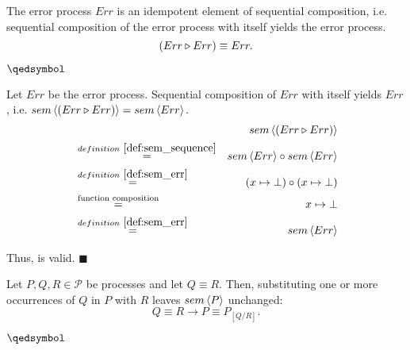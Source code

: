 \begin{theorem}
\label{thm:idempotence_err}
The error process $Err$ is an idempotent element of sequential composition, i.e. sequential composition of the error process with itself yields the error process.
\begin{equation*}
  \left( Err \triangleright Err \right) \equiv Err.
\end{equation*}

\hfill$\qedsymbol$
\end{theorem}

\begin{myproof}
Let $Err$ be the error process. Sequential composition of $Err$ with itself yields $Err$, i.e. $sem \left\langle \left( Err \triangleright Err \right) \right\rangle = sem \left\langle Err \right\rangle$.
\begin{eqnarray*}
  & & \sem{\sequence{Err}{Err}} \\
    & \overset{\defref{def:sem_sequence}}{=} & \sem{Err} \circ \sem{Err} \\
    & \overset{\defref{def:sem_err}}{=} & \left( x \mapsto \bot \right) \circ \left( x \mapsto \bot \right) \\
    & \overset{\text{function composition}}{=} & x \mapsto \bot \\
    & \overset{\defref{def:sem_err}}{=} & \sem{Err}
\end{eqnarray*}

Thus,  is valid. \hfill$\blacksquare$
\end{myproof}



\begin{theorem}
\label{thm:substitution_equivalence}
Let $P, Q, R \in \mathcal{P}$ be processes and let $Q \equiv R$. Then, substituting one or more occurrences of $Q$ in $P$ with $R$ leaves $sem \left\langle P \right\rangle$ unchanged:
  \begin{equation*}
    Q \equiv R \rightarrow P \equiv P_{\left[ Q / R \right]}.
  \end{equation*}
  
  \hfill$\qedsymbol$
\end{theorem}


